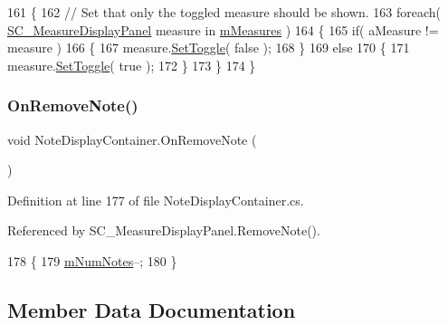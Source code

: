 \begin{DoxyCode}
161     \{
162         \textcolor{comment}{// Set that only the toggled measure should be shown.}
163         \textcolor{keywordflow}{foreach}( \hyperlink{class_s_c___measure_display_panel}{SC\_MeasureDisplayPanel} measure \textcolor{keywordflow}{in} 
      \hyperlink{class_note_display_container_ae5ca6e7ea4ab2baaab9ff649bf25c0d6}{mMeasures} )
164         \{
165             \textcolor{keywordflow}{if}( aMeasure != measure )
166             \{
167                 measure.\hyperlink{class_s_c___measure_display_panel_a6512fa5010bcecd85f7e8542cea91310}{SetToggle}( \textcolor{keyword}{false} );
168             \}
169             \textcolor{keywordflow}{else}
170             \{
171                 measure.\hyperlink{class_s_c___measure_display_panel_a6512fa5010bcecd85f7e8542cea91310}{SetToggle}( \textcolor{keyword}{true} );
172             \}
173         \}
174     \}
\end{DoxyCode}
\mbox{\label{class_note_display_container_a400c6151d074c2cb1f116ff589ce13b8}} 
\subsubsection{\texorpdfstring{On\+Remove\+Note()}{OnRemoveNote()}}
{\footnotesize\ttfamily void Note\+Display\+Container.\+On\+Remove\+Note (\begin{DoxyParamCaption}{ }\end{DoxyParamCaption})}



Definition at line 177 of file Note\+Display\+Container.\+cs.



Referenced by S\+C\+\_\+\+Measure\+Display\+Panel.\+Remove\+Note().


\begin{DoxyCode}
178     \{
179         \hyperlink{class_note_display_container_a31be4fc67033a1dcb210819e0e90d7e6}{mNumNotes}--;
180     \}
\end{DoxyCode}


\subsection{Member Data Documentation}
\mbox{\label{class_note_display_container_a79a97c9e0f45ba4242b66d6ec317d020}} 
